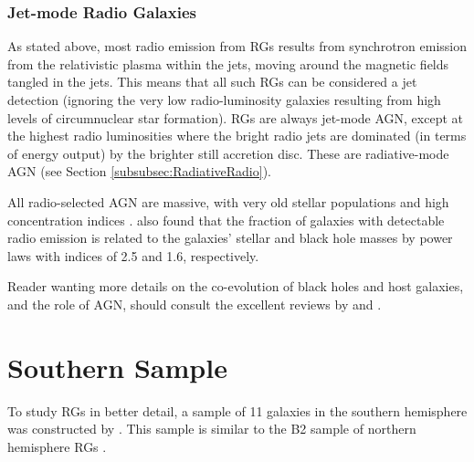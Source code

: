 		\subsubsection{Jet-mode Radio Galaxies}
			\label{subsubsec:JetRadio}
			As stated above, most radio emission from RGs results from synchrotron emission from the relativistic plasma within the jets, moving around the magnetic fields tangled in the jets. This means that all such RGs can be considered a jet detection (ignoring the very low radio-luminosity galaxies resulting from high levels of circumnuclear star formation). RGs are always jet-mode AGN, except at the highest radio luminosities where the bright radio jets are dominated (in terms of energy output) by the brighter still accretion disc. These are radiative-mode AGN (see Section \ref{subsubsec:RadiativeRadio}).

			All radio-selected AGN are massive, with very old stellar populations and high concentration indices \citep[e.g.][]{Best2005}. \citet{Best2005} also found that the fraction of galaxies with detectable radio emission is related to the galaxies' stellar and black hole masses by power laws with indices of 2.5 and 1.6, respectively.

	Reader wanting more details on the co-evolution of black holes and host galaxies, and the role of AGN, should consult the excellent reviews by \citet{Fabian2012} and \citet{Heckman2014}. 

\section{Southern Sample}
	\label{sec:Sample}
	To study RGs in better detail, a sample of 11 galaxies in the southern hemisphere was constructed by \citet{Prandoni2010}. This sample is similar to the B2 sample of northern hemisphere RGs \citep{Prandoni2007}.

